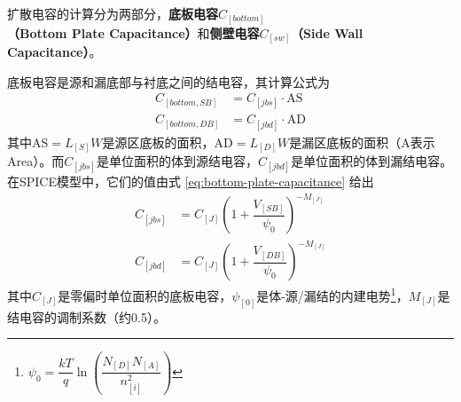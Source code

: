 扩散电容的计算分为两部分，\textbf{底板电容$C_[bottom]$（Bottom Plate Capacitance）}和\textbf{侧壁电容$C_[sw]$（Side Wall Capacitance）}。

底板电容是源和漏底部与衬底之间的结电容，其计算公式为
\begin{equation}
    \begin{aligned}
        C_[bottom,SB] &= C_[jbs]\cdot\mathrm{AS} \\
        C_[bottom,DB] &= C_[jbd]\cdot\mathrm{AD}
    \end{aligned}
\end{equation}
其中$\mathrm{AS} = L_[S]W$是源区底板的面积，$\mathrm{AD} = L_[D]W$是漏区底板的面积（A表示Area）。而$C_[jbs]$是单位面积的体到源结电容，$C_[jbd]$是单位面积的体到漏结电容。
在SPICE模型中，它们的值由式 \ref{eq:bottom-plate-capacitance} 给出
\begin{equation}
    \begin{aligned}
        C_[jbs] &= C_[J] \left(1 + \dfrac{V_[SB]}{\psi_0}\right)^{-M_[J]} \\
        C_[jbd] &= C_[J] \left(1 + \dfrac{V_[DB]}{\psi_0}\right)^{-M_[J]}
    \end{aligned}
    \label{eq:bottom-plate-capacitance}
\end{equation}
其中$C_[J]$是零偏时单位面积的底板电容，$\psi_[0]$是体-源/漏结的内建电势\footnote{$\psi_{0} = \dfrac{kT}{q}\ln\left(\dfrac{N_[D]N_[A]}{n_[i]^2}\right)$}，$M_[J]$是结电容的调制系数（约0.5）。

